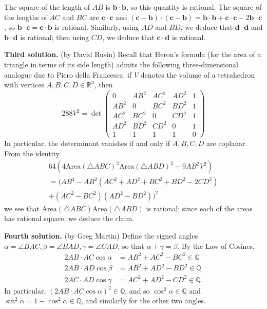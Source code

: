 \documentclass[amssymb,twocolumn,pra,10pt,aps]{revtex4-1}
\begin{document}
\begin{itemize}
The square of the length of $AB$ is $\mathbf{b} \cdot \mathbf{b}$, so this quantity is rational.
The square of the lengths of $AC$ and $BC$ are $\mathbf{c} \cdot \mathbf{c}$ and
$(\mathbf{c} - \mathbf{b}) \cdot (\mathbf{c} - \mathbf{b}) = \mathbf{b} \cdot \mathbf{b} + \mathbf{c} \cdot \mathbf{c}
- 2 \mathbf{b} \cdot \mathbf{c}$, so $\mathbf{b} \cdot \mathbf{c} = \mathbf{c} \cdot \mathbf{b}$ is rational.
Similarly, using $AD$ and $BD$, we deduce that $\mathbf{d} \cdot \mathbf{d}$ and $\mathbf{b} \cdot \mathbf{d}$ is rational; then using $CD$, we deduce that $\mathbf{c} \cdot \mathbf{d}$ is rational.

\noindent
\textbf{Third solution.}
(by David Rusin)
Recall that Heron's formula (for the area of a triangle in terms of its side length) admits the following three-dimensional analogue due to Piero della Francesca: if $V$ denotes the volume of a tetrahedron with vertices $A,B,C,D \in \mathbb{R}^3$, then
\[
288 V^2 = \det
\begin{pmatrix}
0 & AB^2 & AC^2 & AD^2 & 1 \\
AB^2 & 0 & BC^2 & BD^2 & 1 \\
AC^2 & BC^2 & 0 & CD^2 & 1 \\
AD^2 & BD^2 & CD^2 & 0 & 1 \\
1 & 1 & 1 & 1 & 0
\end{pmatrix}
\]
In particular, the determinant vanishes if and only if $A,B,C,D$ are coplanar. From the identity
\begin{gather*}
64(4 \mathrm{Area}(\triangle ABC)^2 \mathrm{Area}(\triangle ABD)^2 - 9 AB^2 V^2) \\
= (AB^4 - AB^2(AC^2 + AD^2 + BC^2 + BD^2 - 2CD^2) \\ + (AC^2-BC^2)(AD^2-BD^2))^2
\end{gather*}
we see that $\mathrm{Area}(\triangle ABC) \mathrm{Area}(\triangle ABD)$ is rational;
since each of the areas has rational square, we deduce the claim.

\noindent
\textbf{Fourth solution.}
(by Greg Martin)
Define the signed angles $\alpha = \angle BAC, \beta = \angle BAD, \gamma = \angle CAD$, so that $\alpha + \gamma = \beta$. By the Law of Cosines,
\begin{align*}
2 AB \cdot AC \cos \alpha &= AB^2 + AC^2 - BC^2 \in \mathbb{Q} \\
2  AB \cdot AD \cos \beta &= AB^2 + AD^2 - BD^2 \in \mathbb{Q} \\
2  AC \cdot AD \cos \gamma &= AC^2 + AD^2 - CD^2 \in \mathbb{Q}.
\end{align*}
In particular, $(2 AB \cdot AC \cos \alpha)^2 \in \mathbb{Q}$, and so
$\cos^2 \alpha \in \mathbb{Q}$ and $\sin^2 \alpha = 1 - \cos^2 \alpha \in \mathbb{Q}$,
and similarly for the other two angles.


\end{itemize}
\end{document}
